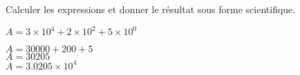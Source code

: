     Calculer les expressions et donner le résultat sous forme scientifique.
    \begin{spacing}{2}
        \begin{itemize}
            \def\item{}
            \item $A = 3\times 10^4 + 2\times 10^2 + 5\times 10^0$

            {\red
            $A = \num{30000} + 200 + 5$\\
            $A = \num{30205}$\\
            $A = \num{3.0205}\times 10^4$\\
            }
        \end{itemize}
    \end{spacing}
        \Coupe
